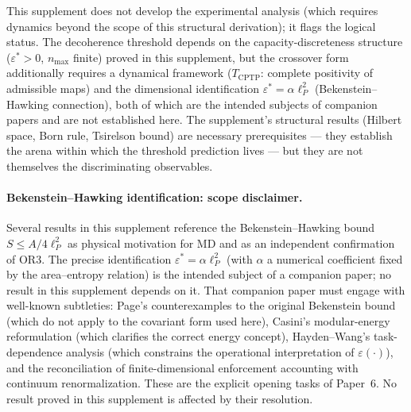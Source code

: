 \documentclass[11pt,a4paper]{article}
\theoremstyle{definition}
\newcommand{\eps}{\varepsilon}
\begin{document}
This supplement does not develop the experimental analysis (which requires dynamics beyond the scope of this structural derivation); it flags the logical status.  The decoherence threshold depends on the capacity-discreteness structure ($\eps^* > 0$, $n_{\max}$ finite) proved in this supplement, but the crossover form additionally requires a dynamical framework ($T_{\mathrm{CPTP}}$: complete positivity of admissible maps) and the dimensional identification $\eps^* = \alpha\ell_P^2$ (Bekenstein--Hawking connection), both of which are the intended subjects of companion papers and are not established here.  The supplement's structural results (Hilbert space, Born rule, Tsirelson bound) are necessary prerequisites --- they establish the arena within which the threshold prediction lives --- but they are not themselves the discriminating observables.

\paragraph{Bekenstein--Hawking identification: scope disclaimer.}
Several results in this supplement reference the Bekenstein--Hawking bound $S \le A/4\ell_P^2$ as physical motivation for MD and as an independent confirmation of OR3.  The precise identification $\eps^* = \alpha\ell_P^2$ (with $\alpha$ a numerical coefficient fixed by the area--entropy relation) is the intended subject of a companion paper; no result in this supplement depends on it.  That companion paper must engage with well-known subtleties: Page's counterexamples to the original Bekenstein bound (which do not apply to the covariant form used here), Casini's modular-energy reformulation (which clarifies the correct energy concept), Hayden--Wang's task-dependence analysis (which constrains the operational interpretation of $\eps(\cdot)$), and the reconciliation of finite-dimensional enforcement accounting with continuum renormalization.  These are the explicit opening tasks of Paper~6.  No result proved in this supplement is affected by their resolution.
\end{document}
